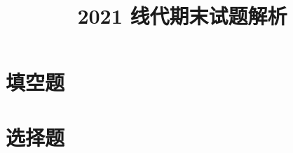 \documentclass[cn,hazy,blue,12pt,normal, math=newtx]{elegantnote}
\title{2021 线代期末试题解析}
\author{}
\institute{}
\date{\zhtoday}
\begin{document}
\maketitle
\section{填空题}

\section{选择题}


\section{}

\section{}

\section{}

\section{}

\section{}

\section{}

\section{}

\section{}

\end{document}
